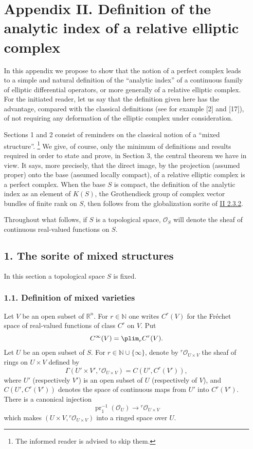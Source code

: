 \newpage
{}\section*{Appendix II. Definition of the analytic index of a relative elliptic complex}

In this appendix we propose to show that the notion of a perfect complex leads to a simple and natural definition of the ``analytic index'' of a continuous family of elliptic differential operators, or more generally of a relative elliptic complex. For the initiated reader, let us say that the definition given here has the advantage, compared with the classical definitions (see for example [2] and [17]), of not requiring any deformation of the elliptic complex under consideration.

Sections 1 and 2 consist of reminders on the classical notion of a ``mixed structure''.
\footnote{The informed reader is advised to skip them.}
We give, of course, only the minimum of definitions and results required in order to state and prove, in Section 3, the central theorem we have in view. It says, more precisely, that the direct image, by the projection (assumed proper) onto the base (assumed locally compact), of a relative elliptic complex is a perfect complex. When the base $S$ is compact, the definition of the analytic index as an element of $K(S)$, the Grothendieck group of complex vector bundles of finite rank on $S$, then follows from the globalization sorite of \hyperlink{sga6.e02.prop.2-3-2}{II 2.3.2}.

Throughout what follows, if $S$ is a topological space, $\mathcal O_S$ will denote the sheaf of continuous real-valued functions on $S$.

\subsection*{1. The sorite of mixed structures}

In this section a topological space $S$ is fixed.

\subsubsection*{1.1. Definition of mixed varieties}

Let $V$ be an open subset of $\mathbb R^n$. For $r\in\mathbb N$ one writes $C^r(V)$ for the Fréchet space of real-valued functions of class $C^r$ on $V$. Put
\[
 C^\infty(V)=\plim_r C^r(V).
\]
Let $U$ be an open subset of $S$. For $r\in\mathbb N\cup\{\infty\}$, denote by ${}^r\mathcal O_{U\times V}$ the sheaf of rings on $U\times V$ defined by
\[
 \Gamma(U'\times V',{}^r\mathcal O_{U\times V})
 =C(U',C^r(V')),
\]
where $U'$ (respectively $V'$) is an open subset of $U$ (respectively of $V$), and $C(U',C^r(V'))$ denotes the space of continuous maps from $U'$ into $C^r(V')$. There is a canonical injection
\[
 \operatorname{pr}_1^{-1}(\mathcal O_U)\longrightarrow {}^r\mathcal O_{U\times V}
\]
which makes $(U\times V,{}^r\mathcal O_{U\times V})$ into a ringed space over $U$.

